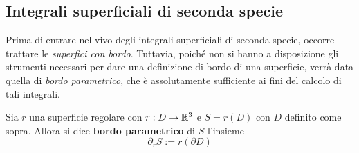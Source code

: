  \subsection{Integrali superficiali di seconda specie}
 Prima di entrare nel vivo degli integrali superficiali di seconda specie, occorre trattare le \textit{superfici con bordo}. Tuttavia, poiché non si hanno a disposizione gli strumenti necessari per dare una definizione di bordo di una superficie, verrà data quella di \textit{bordo parametrico}, che è assolutamente sufficiente ai fini del calcolo di tali integrali.
 \begin{definition} \label{Bordo parametrico}
     Sia $r$ una superficie regolare con $r: D \to \mathbb{R}^3$ e $S=r(D)$ con $D$ definito come sopra. Allora si dice \textbf{bordo parametrico} di $S$ l'insieme
     \begin{equation}
         \partial_r S := r(\partial D)
     \end{equation}
 \end{definition}

